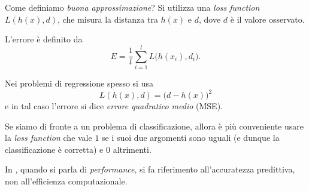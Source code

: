 Come definiamo \emph{buona approssimazione}? Si utilizza una \emph{loss function} $L(h(x),d)$, che misura la distanza tra $h(x)$ e $d$, dove $d$ è il valore osservato.

\begin{definition}[Errore]
L'errore è definito da
\begin{equation}
E=\frac 1l\sum_{i=1}^{l}L\big(h(x_i),d_i\big).
\end{equation}
\end{definition}

\begin{example}
Nei problemi di regressione spesso si usa \[L(h(x),d)=\big(d-h(x)\big)^2\]e in tal caso l'errore si dice \emph{errore quadratico medio} (MSE).

Se siamo di fronte a un problema di classificazione, allora è più conveniente usare la \emph{loss function} che vale $1$ se i suoi due argomenti sono uguali (e dunque la classificazione è corretta) e $0$ altrimenti.
\end{example}

\begin{remark}
In \ml, quando si parla di \emph{performance}, si fa riferimento all'accuratezza predittiva, non all'efficienza computazionale.
\end{remark}